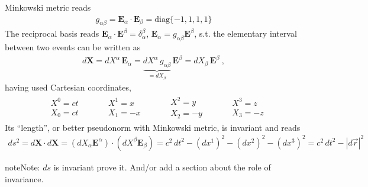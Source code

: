 \documentclass[letterpaper,10pt,english]{jupyterBook}
\begin{document}
\sphinxAtStartPar
Minkowski metric reads
\begin{equation*}
\begin{split}g_{\alpha \beta} = \mathbf{E}_{\alpha} \cdot \mathbf{E}_{\beta} = \text{diag}\{-1, 1, 1, 1\}\end{split}
\end{equation*}
\sphinxAtStartPar
The reciprocal basis reads \(\mathbf{E}_{\alpha} \cdot \mathbf{E}^{\beta} = \delta_{\alpha}^{\beta}\), \(\mathbf{E}_{\alpha} = g_{\alpha \beta} \mathbf{E}^{\beta}\), s.t. the elementary interval between two events can be written as
\begin{equation*}
\begin{split}d \mathbf{X} = d X^{\alpha} \, \mathbf{E}_{\alpha} = \underbrace{d X^{\alpha} \, g_{\alpha \beta}}_{= dX_{\beta}} \, \mathbf{E}^{\beta} = d X_{\beta} \, \mathbf{E}^{\beta} \ ,\end{split}
\end{equation*}
\sphinxAtStartPar
having used Cartesian coordinates,
\begin{equation*}
\begin{split}
  \begin{aligned}  & X^0 = c t \\  & X_0 = c t \end{aligned} \qquad
  \begin{aligned}  & X^1 =   x \\  & X_1 =  -x \end{aligned} \qquad
  \begin{aligned}  & X^2 =   y \\  & X_2 =  -y \end{aligned} \qquad
  \begin{aligned}  & X^3 =   z \\  & X_3 =  -z \end{aligned}
\end{split}
\end{equation*}
\sphinxAtStartPar
Its “length”, or better pseudo\sphinxhyphen{}norm with Minkowski metric, is invariant and reads
\begin{equation*}
\begin{split}d s^2 = d \mathbf{X} \cdot d \mathbf{X} = \left( dX_{\alpha} \mathbf{E}^{\alpha} \right) \cdot \left( dX^{\beta} \mathbf{E}_{\beta} \right) = c^2 \, d t^2 - (dx^1)^2 - (dx^2)^2 - (dx^3)^2 = c^2 \, dt^2 - |d \vec{r}|^2 \end{split}
\end{equation*}
\begin{sphinxadmonition}{note}{Note:}
\sphinxAtStartPar
\(ds\) is invariant
 prove it. And/or add a section about the role of invariance.
\end{sphinxadmonition}
\end{document}
